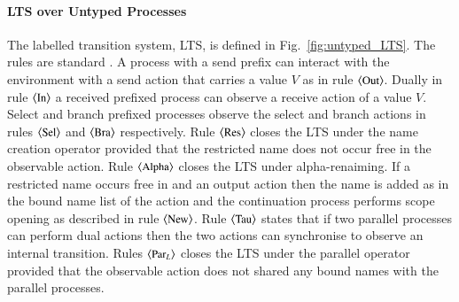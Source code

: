 \paragraph{LTS over Untyped Processes}
The labelled transition system, LTS, is defined in
Fig.~\ref{fig:untyped_LTS}. The rules are standard 
\cite{DBLP:conf/forte/KouzapasYH11,KY13,dkphdthesis}.
A process with a send prefix can
interact with the environment with a send action that carries a value
$V$ as in rule $\ltsrule{Out}$.  Dually in rule $\ltsrule{In}$ a
received prefixed process can observe a receive action of a value $V$.
Select and branch prefixed processes observe the select and branch
actions in rules $\ltsrule{Sel}$ and $\ltsrule{Bra}$ respectively.
Rule $\ltsrule{Res}$ closes the LTS under the name creation operator
provided that the restricted name does not occur free in the
observable action. 
Rule $\ltsrule{Alpha}$ closes the LTS
under alpha-renaiming.
If a restricted name occurs free in and an output
action then the name is added as in the bound name list of the action
and the continuation process performs scope opening as described in
rule $\ltsrule{New}$.  
Rule $\ltsrule{Tau}$ states that if two parallel processes can perform
dual actions then the two actions can synchronise to observe an
internal transition.  Rules $\ltsrule{Par${}_L$}$ 
closes the LTS under the parallel operator provided that the observable
action does not shared any bound names with the parallel processes.



